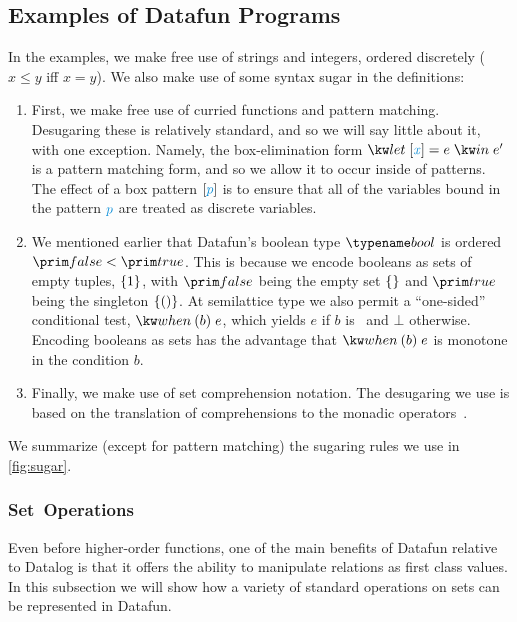 

\subsection{Examples of Datafun Programs}



In the examples, we make free use of strings and integers, ordered discretely
($x \le y$ iff $x = y$). We also make use of some syntax sugar in the
definitions:

\begin{enumerate}
\item First, we make free use of curried functions and pattern
  matching. Desugaring these is relatively standard, and so we will
  say little about it, with one exception. Namely, the box-elimination
  form $\eletbox x e e'$ is a pattern matching form, and so we allow
  it to occur inside of patterns. The effect of a box pattern
  $\pbox{\isocolor p}$ is to ensure that all of the variables bound in the
  pattern $\isocolor p$ are treated as discrete variables.

\item We mentioned earlier that Datafun's boolean type $\tbool$ is ordered
  $\efalse < \etrue$. This is because we encode booleans as sets of empty
  tuples, $\{{1}\}$, with $\efalse$ being the empty set $\{{}\}$ and
  $\etrue$ being the singleton $\{{({})}\}$. At semilattice type we
  also permit a ``one-sided'' conditional test, $\ewhen{b}{e}$, which yields $e$
  if $b$ is \etrue\ and $\bot$ otherwise. Encoding booleans as sets has the
  advantage that $\ewhen{b}{e}$ is monotone in the condition $b$.

\item Finally, we make use of set comprehension notation. The
  desugaring we use is based on the translation of comprehensions to
  the monadic operators~\cite{wadler-monad-comprehensions}.
\end{enumerate}
We summarize (except for pattern matching) the sugaring rules we use in
\cref{fig:sugar}.

\subsubsection{Set\, Operations}

Even before higher-order functions, one of the main benefits of
Datafun relative to Datalog is that it offers the ability to manipulate relations
as first class values. In this subsection we will show how a variety
of standard operations on sets can be represented in Datafun.

